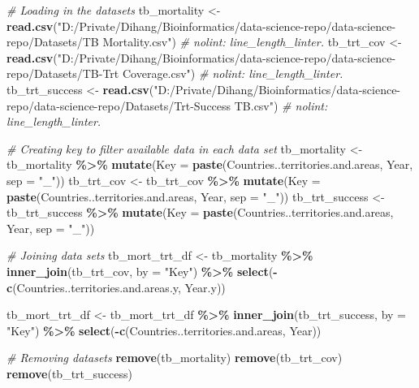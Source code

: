\documentclass[
]{article}
\newenvironment{Shaded}{\begin{snugshade}}{\end{snugshade}}
\newcommand{\AttributeTok}[1]{\textcolor[rgb]{0.13,0.29,0.53}{#1}}
\newcommand{\CommentTok}[1]{\textcolor[rgb]{0.56,0.35,0.01}{\textit{#1}}}
\newcommand{\FunctionTok}[1]{\textcolor[rgb]{0.13,0.29,0.53}{\textbf{#1}}}
\newcommand{\NormalTok}[1]{#1}
\newcommand{\OtherTok}[1]{\textcolor[rgb]{0.56,0.35,0.01}{#1}}
\newcommand{\SpecialCharTok}[1]{\textcolor[rgb]{0.81,0.36,0.00}{\textbf{#1}}}
\newcommand{\StringTok}[1]{\textcolor[rgb]{0.31,0.60,0.02}{#1}}
\begin{document}
\begin{Shaded}
\begin{Highlighting}[]
\CommentTok{\# Loading in the datasets}
\NormalTok{tb\_mortality }\OtherTok{\textless{}{-}} \FunctionTok{read.csv}\NormalTok{(}\StringTok{"D:/Private/Dihang/Bioinformatics/data{-}science{-}repo/data{-}science{-}repo/Datasets/TB Mortality.csv"}\NormalTok{) }\CommentTok{\# nolint: line\_length\_linter.}
\NormalTok{tb\_trt\_cov }\OtherTok{\textless{}{-}} \FunctionTok{read.csv}\NormalTok{(}\StringTok{"D:/Private/Dihang/Bioinformatics/data{-}science{-}repo/data{-}science{-}repo/Datasets/TB{-}Trt Coverage.csv"}\NormalTok{) }\CommentTok{\# nolint: line\_length\_linter.}
\NormalTok{tb\_trt\_success }\OtherTok{\textless{}{-}} \FunctionTok{read.csv}\NormalTok{(}\StringTok{"D:/Private/Dihang/Bioinformatics/data{-}science{-}repo/data{-}science{-}repo/Datasets/Trt{-}Success TB.csv"}\NormalTok{) }\CommentTok{\# nolint: line\_length\_linter.}

\CommentTok{\# Creating key to filter available data in each data set}
\NormalTok{tb\_mortality }\OtherTok{\textless{}{-}}\NormalTok{ tb\_mortality }\SpecialCharTok{\%\textgreater{}\%}
  \FunctionTok{mutate}\NormalTok{(}\AttributeTok{Key =}  \FunctionTok{paste}\NormalTok{(Countries..territories.and.areas, Year, }\AttributeTok{sep =} \StringTok{"\_"}\NormalTok{))}
\NormalTok{tb\_trt\_cov }\OtherTok{\textless{}{-}}\NormalTok{ tb\_trt\_cov }\SpecialCharTok{\%\textgreater{}\%}
  \FunctionTok{mutate}\NormalTok{(}\AttributeTok{Key =}  \FunctionTok{paste}\NormalTok{(Countries..territories.and.areas, Year, }\AttributeTok{sep =} \StringTok{"\_"}\NormalTok{))}
\NormalTok{tb\_trt\_success }\OtherTok{\textless{}{-}}\NormalTok{ tb\_trt\_success }\SpecialCharTok{\%\textgreater{}\%}
  \FunctionTok{mutate}\NormalTok{(}\AttributeTok{Key =}  \FunctionTok{paste}\NormalTok{(Countries..territories.and.areas, Year, }\AttributeTok{sep =} \StringTok{"\_"}\NormalTok{))}

\CommentTok{\# Joining data sets}
\NormalTok{tb\_mort\_trt\_df }\OtherTok{\textless{}{-}}\NormalTok{ tb\_mortality }\SpecialCharTok{\%\textgreater{}\%}
  \FunctionTok{inner\_join}\NormalTok{(tb\_trt\_cov, }\AttributeTok{by =} \StringTok{"Key"}\NormalTok{) }\SpecialCharTok{\%\textgreater{}\%}
  \FunctionTok{select}\NormalTok{(}\SpecialCharTok{{-}}\FunctionTok{c}\NormalTok{(Countries..territories.and.areas.y, Year.y))}

\NormalTok{tb\_mort\_trt\_df }\OtherTok{\textless{}{-}}\NormalTok{ tb\_mort\_trt\_df }\SpecialCharTok{\%\textgreater{}\%}
  \FunctionTok{inner\_join}\NormalTok{(tb\_trt\_success, }\AttributeTok{by =} \StringTok{"Key"}\NormalTok{) }\SpecialCharTok{\%\textgreater{}\%}
  \FunctionTok{select}\NormalTok{(}\SpecialCharTok{{-}}\FunctionTok{c}\NormalTok{(Countries..territories.and.areas, Year))}

\CommentTok{\# Removing datasets}
\FunctionTok{remove}\NormalTok{(tb\_mortality)}
\FunctionTok{remove}\NormalTok{(tb\_trt\_cov)}
\FunctionTok{remove}\NormalTok{(tb\_trt\_success)}
\end{Highlighting}
\end{Shaded}
\end{document}
